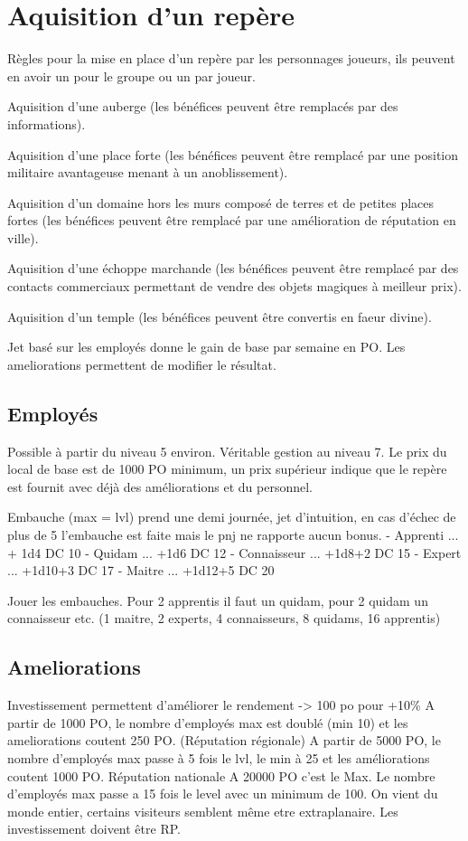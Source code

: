 \section*{Aquisition d'un repère}
 Règles pour la mise en place d'un repère par les personnages joueurs, ils peuvent en avoir un pour le groupe ou un par joueur.

Aquisition d'une auberge (les bénéfices peuvent être remplacés par des informations).

Aquisition d'une place forte (les bénéfices peuvent être remplacé par une position militaire avantageuse menant à un anoblissement).

Aquisition d'un domaine hors les murs composé de terres et de petites places fortes (les bénéfices peuvent être remplacé par une amélioration de réputation en ville).

Aquisition d'une échoppe marchande (les bénéfices peuvent être remplacé par des contacts commerciaux permettant de vendre des objets magiques à meilleur prix).

Aquisition d'un temple (les bénéfices peuvent être convertis en faeur divine).

Jet basé sur les employés donne le gain de base par semaine en PO. Les ameliorations permettent de modifier le résultat. 

\subsection*{Employés}

Possible à partir du niveau 5 environ. Véritable gestion au niveau 7. Le prix du local de base est de 1000 PO minimum, un prix supérieur indique que le repère est fournit avec déjà des améliorations et du personnel.

Embauche (max = lvl) prend une demi journée, jet d'intuition, en cas d'échec de plus de 5 l'embauche est faite mais le pnj ne rapporte aucun bonus.
 - Apprenti ... + 1d4 DC 10
 - Quidam ... +1d6 DC 12
 - Connaisseur ... +1d8+2 DC 15
 - Expert ... +1d10+3 DC 17
 - Maitre ... +1d12+5 DC 20


Jouer les embauches. Pour 2 apprentis il faut un quidam, pour 2 quidam un connaisseur etc. (1 maitre, 2 experts, 4 connaisseurs, 8 quidams, 16 apprentis)

\subsection*{Ameliorations}

Investissement permettent d'améliorer le rendement -> 100 po pour +10\%
A partir de 1000 PO, le nombre d'employés max est doublé (min 10) et les
ameliorations coutent 250 PO. (Réputation régionale)
A partir de 5000 PO, le nombre d'employés max passe à 5 fois le lvl, le min
à 25 et les améliorations coutent 1000 PO. Réputation nationale
A 20000 PO c'est le Max. Le nombre d'employés max passe a 15 fois le level
avec un minimum de 100. On vient du monde entier, certains visiteurs 
semblent même etre extraplanaire. Les investissement doivent être RP.

